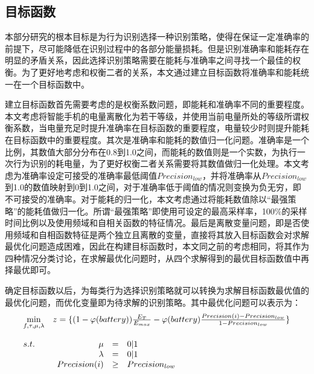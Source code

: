 \subsection{目标函数}
\par 本部分研究的根本目标是为行为识别选择一种识别策略，使得在保证一定准确率的前提下，尽可能降低在识别过程中的各部分能量损耗。但是识别准确率和能耗存在明显的矛盾关系，因此选择识别策略需要在能耗与准确率之间寻找一个最佳的权衡。为了更好地考虑和权衡二者的关系，本文通过建立目标函数将准确率和能耗统一在一个目标函数中。
\par 建立目标函数首先需要考虑的是权衡系数问题，即能耗和准确率不同的重要程度。本文考虑将智能手机的电量离散化为若干等级，并使用当前电量所处的等级所谓权衡系数，当电量充足时提升准确率在目标函数的重要程度，电量较少时则提升能耗在目标函数中的重要程度。其次是准确率和能耗的数值归一化问题。准确率是一个比例，其数值大部分分布在0.8到1.0之间，而能耗的数值则是一个实数，为执行一次行为识别的耗电量，为了更好权衡二者关系需要将其数值做归一化处理。本文考虑为准确率设定可接受的准确率最低阈值$Precision_{low}$，并将准确率从$Precision_{low}$到1.0的数值映射到0到1.0之间，对于准确率低于阈值的情况则变换为负无穷，即不可接受的准确率。对于能耗的归一化，本文考虑通过将能耗数值除以“最强策略”的能耗值做归一化。所谓“最强策略”即使用可设定的最高采样率，100\%的采样时间比例以及使用频域和自相关函数的特征情况。最后是离散变量问题，即是否使用频域和自相函数特征是两个独立且离散的变量，直接将其放入目标函数会对求解最优化问题造成困难，因此在构建目标函数时，本文同之前的考虑相同，将其作为四种情况分类讨论，在求解最优化问题时，从四个求解得到的最优目标函数值中再择最优即可。
\par 确定目标函数以后，为每类行为选择识别策略就可以转换为求解目标函数最优值的最优化问题，而优化变量即为待求解的识别策略。其中最优化问题可以表示为：
\begin{equation}
  \begin{array}{ll}
    \min \limits_{f, \tau, \mu, \lambda}  & z=\{(1-\varphi (battery)) \frac{E_T}{E_{max}} - \varphi (battery) \frac{Precision(i) - Precision_{low}}{1 - Precision_{low}}\} \\
    \\
    s.t. & \begin{array}[t]{rll}
             \mu 			 &  =    & 0|1 \\
             \lambda         &  =    & 0|1  \\
             Precision(i)    & \geq  & Precision_{low}
           \end{array}
  \end{array}
\end{equation}

